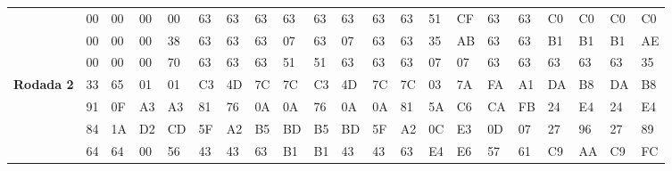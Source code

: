 \documentclass[
    article,            %
    11pt,               %
    oneside,            %
    a4paper,            %
    english,            %
    brazil,             %
    sumario=tradicional,
    ]{abntex2}
\begin{document}
\begin{table}[H]
{\begin{tabular}{|
>{\columncolor[HTML]{C0C0C0}}l |llll|llll|llll|llll|llll|}
                                                     & 00             & 00             & 00             & 00             & 63            & 63           & 63           & 63           & 63            & 63            & 63           & 63           & 51            & CF            & 63            & 63           & C0            & C0            & C0            & C0           \\
                                                     & 00             & 00             & 00             & 38            & 63            & 63           & 63           & 07            & 63            & 07             & 63           & 63           & 35            & AB            & 63            & 63           & B1            & B1            & B1            & AE           \\
                                                     & 00             & 00             & 00             & 70            & 63            & 63           & 63           & 51           & 51            & 63            & 63           & 63           & 07             & 07             & 63            & 63           & 63            & 63            & 63            & 35           \\ \hline
\textbf{Rodada 2}                                                    & 33            & 65            & 01             & 01             & C3            & 4D           & 7C           & 7C           & C3            & 4D            & 7C           & 7C           & 03             & 7A            & FA            & A1           & DA            & B8            & DA            & B8           \\
                                                     & 91            & 0F            & A3            & A3            & 81            & 76           & 0A           & 0A           & 76            & 0A            & 0A           & 81           & 5A            & C6            & CA            & FB           & 24            & E4            & 24            & E4           \\
                                                     & 84            & 1A            & D2            & CD            & 5F            & A2           & B5           & BD           & B5            & BD            & 5F           & A2           & 0C            & E3            & 0D            & 07            & 27            & 96            & 27            & 89           \\
                                                     & 64            & 64            & 00             & 56            & 43            & 43           & 63           & B1           & B1            & 43            & 43           & 63           & E4            & E6            & 57            & 61           & C9            & AA            & C9            & FC           \\ \hline

\end{tabular}}
\end{table}
\end{document}
